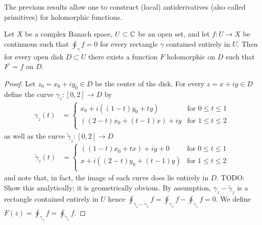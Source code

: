 The previous results allow one to construct (local) antiderivatives (also called primitives) for holomorphic functions.
\begin{lem}\label{banach:LocalHolomorphicPrimitive}Let $X$ be a complex Banach space, $U \subset \mathbb{C}$ be an open set, and let $f: U \to X$ be continuous such that $\oint_\gamma f = 0$ for every rectangle $\gamma$ contained entirely in $U$.   Then for every open disk $D \subset U$ there exists a function $F$ holomorphic on $D$ such that $F^\prime = f$ on $D$.   
\end{lem}
\begin{proof}
  Let $z_0 = x_0 + iy_0 \in D$ be the center of the disk.  For every $z = x + i y\in D$ define the curve $\gamma_z : [0,2] \to D$ by
  \begin{align*}
    \gamma_z(t) &= \begin{cases}
      x_0 + i((1-t)y_0 + ty) & \text{for $0 \leq t \leq 1$} \\
      ((2-t)x_0 + (t-1) x) + iy & \text{for $1 \leq t \leq 2$} \\
    \end{cases}
  \end{align*}
as well as the curve $\tilde{\gamma}_z : [0,2] \to D$
  \begin{align*}
    \tilde{\gamma}_z(t) &= \begin{cases}
      ((1-t)x_0 + tx) + iy+0 & \text{for $0 \leq t \leq 1$} \\
      x + i((2-t)y_0 + (t-1) y) & \text{for $1 \leq t \leq 2$} \\
    \end{cases}
  \end{align*}
  and note that, in fact, the image of each curve does lie entirely in $D$.  TODO: Show this analytically; it is geometrically obvious.   By assumption, $\gamma_z - \tilde{\gamma}_z$ is a rectangle contained entirely in $U$ hence $\oint_{\gamma_z - \tilde{\gamma}_z} f = \oint_{\gamma_z} f  - \oint_{\tilde{\gamma}_z} f = 0$.    We define $F(z) = \oint_{\gamma_z} f  = \oint_{\tilde{\gamma}_z} f$.


\end{proof}
